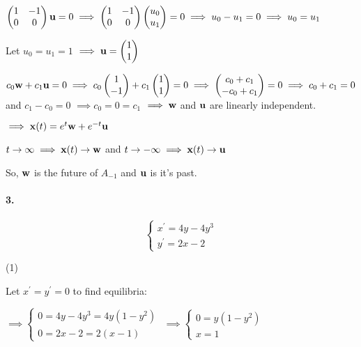 \documentclass{article}
\begin{document}
$\begin{pmatrix} 1&-1\\
  0&0\end{pmatrix}\bold{u} = 0
\implies \begin{pmatrix} 1&-1\\
  0&0\end{pmatrix}\begin{pmatrix} u_0\\
  u_1\end{pmatrix} = 0 \implies u_0-u_1=0 \implies u_0 = u_1$

Let $u_0 = u_1 = 1$
$\implies \bold{u} = \begin{pmatrix} 1\\
  1\end{pmatrix}$

$c_0\bold{w}+ c_1\bold{u} = 0 \implies c_0\begin{pmatrix} 1\\
  -1\end{pmatrix}+c_1\begin{pmatrix} 1\\
  1\end{pmatrix} = 0 \implies \begin{pmatrix} c_0+c_1\\
  -c_0+c_1\end{pmatrix} = 0 \implies c_0 +c_1= 0$ and $c_1-c_0 = 0$
$\implies c_0 = 0 = c_1$
$\implies \bold{w}$ and $\bold{u}$ are linearly independent.

$\implies \bold{x}(t) = e^t\bold{w}+e^{-t}\bold{u}$

$t\rightarrow \infty \implies \bold{x}(t) \rightarrow \bold{w}$
and
$t\rightarrow -\infty \implies \bold{x}(t) \rightarrow \bold{u}$

So, $\bold{w}$ is the future of $A_{-1}$ and $\bold{u}$ is it's past.

\paragraph{3.}

\[\begin{cases}
    x^\prime = 4y -4y^3 \\
    y^\prime = 2x -2
\end{cases}\]

(1)

Let $x^\prime = y^\prime = 0$ to find equilibria:


$\implies \begin{cases}
    0 = 4y -4y^3 = 4y(1-y^2) \\
    0 = 2x -2 = 2(x-1)
\end{cases}$
$\implies \begin{cases}
    0 = y(1 - y^2) \\
    x = 1
\end{cases}$
\end{document}
